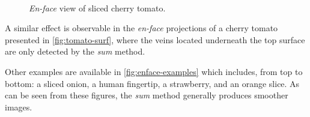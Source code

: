 \begin{figure}[H]
	\myfloatalign
	\\
	\caption{\emph{En-face} view of sliced cherry tomato.}\label{fig:tomato-surf}
\end{figure}

A similar effect is observable in the \emph{en-face} projections of a cherry tomato presented in \autoref{fig:tomato-surf}, where the veins located underneath the top surface are only detected by the \emph{sum} method.

Other examples are available in \autoref{fig:enface-examples} which includes, from top to bottom: a sliced onion, a human fingertip, a strawberry, and an orange slice. As can be seen from these figures, the \emph{sum} method generally produces smoother images. 

